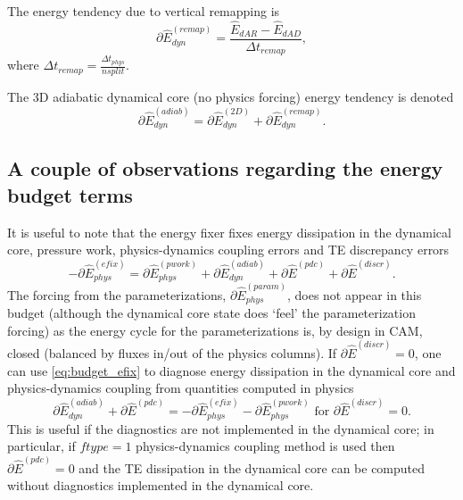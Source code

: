\documentclass{agujournal}
\newcommand*{\gi}[1]{\widehat{#1}}
\begin{document}
\begin{enumerate}
\begin{itemize}
The energy tendency due to vertical remapping is
\begin{equation}
\partial \gi{E}_{dyn}^{({remap})}=\frac{\gi{E}_{dAR}-\gi{E}_{dAD}}{\Delta t_{remap}},
\end{equation}
where $\Delta t_{remap}=\frac{\Delta t_{phys}}{nsplit}$.

The 3D adiabatic dynamical core (no physics forcing) energy tendency is denoted
\begin{equation}
\partial \gi{E}_{dyn}^{({adiab})}=\partial \gi{E}_{dyn}^{({2D})}+\partial \gi{E}_{dyn}^{({remap})}.
\end{equation}


{\color{red}{split parameters not defined}}
\end{itemize}
\end{enumerate}
\subsection{A couple of observations regarding the energy budget terms}
It is useful to note that the energy fixer fixes energy dissipation in the dynamical core, pressure work, physics-dynamics coupling errors and TE discrepancy errors
\begin{equation}
\label{eq:budget_efix}
-\partial \gi{E}_{phys}^{({efix})}=\partial \gi{E}_{phys}^{({pwork})}+\partial \gi{E}_{dyn}^{({adiab})}+\partial \gi{E}^{({pdc})}+\partial \gi{E}^{({discr})}.
\end{equation}
The forcing from the parameterizations, $\partial \gi{E}_{phys}^{({param})}$, does not appear in this budget (although the dynamical core state does `feel' the parameterization forcing) as the energy cycle for the parameterizations is, by design in CAM, closed (balanced by fluxes in/out of the physics columns). If $\partial \gi{E}^{({discr})}=0$, one can use \eqref{eq:budget_efix} to diagnose energy dissipation in the dynamical core and physics-dynamics coupling from quantities computed in physics
\begin{equation}
\partial \gi{E}_{dyn}^{({adiab})}+\partial \gi{E}^{({pdc})}=-\partial \gi{E}_{phys}^{({efix})}-\partial \gi{E}_{phys}^{({pwork})} \text{ for  }\partial \gi{E}^{({discr})}=0.
\end{equation}
This is useful if the diagnostics are not implemented in the dynamical core; in particular, if $ftype=1$ physics-dynamics coupling method is used then $\partial \gi{E}^{({pdc})}=0$ and the TE dissipation in the dynamical core can be computed without diagnostics implemented in the dynamical core. 
\end{document}
